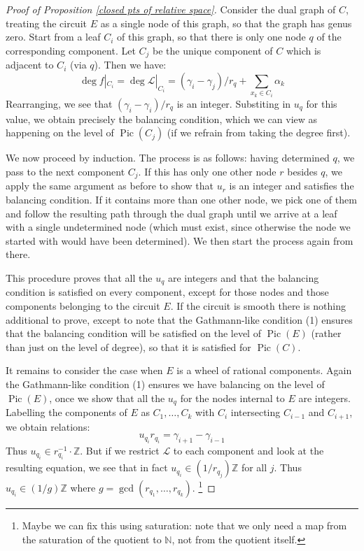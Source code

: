 \documentclass[11pt]{amsart}
\newcommand{\basenote}[1]{\footnote{\color{red}#1}}
\newcommand{\Z}{\mathbb{Z}}
\newcommand{\N}{\mathbb{N}}
\newcommand{\Pic}{\operatorname{Pic}}
\newcommand{\Lcal}{\mathcal{L}}
\theoremstyle{definition}
\theoremstyle{definition}
\begin{document}
\begin{proof}[Proof of Proposition \ref{closed pts of relative space}]
Consider the dual graph of $C$, treating the circuit $E$ as a single node of this graph, so that the graph has genus zero. Start from a leaf $C_i$ of this graph, so that there is only one node $q$ of the corresponding component. Let $C_j$ be the unique component of $C$ which is adjacent to $C_i$ (via $q$). Then we have:
\begin{equation*} \deg f|_{C_i} = \deg \Lcal|_{C_i} = (\gamma_i - \gamma_j)/r_q + \sum_{x_k \in C_i} \alpha_k \end{equation*}
Rearranging, we see that $(\gamma_i - \gamma_i)/r_q$ is an integer. Substiting in $u_q$ for this value, we obtain precisely the balancing condition, which we can view as happening on the level of $\Pic (C_j)$ (if we refrain from taking the degree first).

We now proceed by induction. The process is as follows: having determined $q$, we pass to the next component $C_j$. If this has only one other node $r$ besides $q$, we apply the same argument as before to show that $u_r$ is an integer and satisfies the balancing condition. If it contains more than one other node, we pick one of them and follow the resulting path through the dual graph until we arrive at a leaf with a single undetermined node (which must exist, since otherwise the node we started with would have been determined). We then start the process again from there.

This procedure proves that all the $u_q$ are integers and that the balancing condition is satisfied on every component, except for those nodes and those components belonging to the circuit $E$. If the circuit is smooth there is nothing additional to prove, except to note that the Gathmann-like condition (1) ensures that the balancing condition will be satisfied on the level of $\Pic(E)$ (rather than just on the level of degree), so that it is satisfied for $\Pic(C)$.

It remains to consider the case when $E$ is a wheel of rational components. Again the Gathmann-like condition (1) ensures we have balancing on the level of $\Pic(E)$, once we show that all the $u_q$ for the nodes internal to $E$ are integers. Labelling the components of $E$ as $C_1,\ldots,C_k$ with $C_i$ intersecting $C_{i-1}$ and $C_{i+1}$, we obtain relations:
\begin{equation*} u_{q_i} r_{q_i} = \gamma_{i+1} - \gamma_{i-1} \end{equation*}
Thus $u_{q_i} \in r_{q_i}^{-1} \cdot \Z$. But if we restrict $\Lcal$ to each component and look at the resulting equation, we see that in fact $u_{q_i} \in (1/r_{q_j}) \Z$ for all $j$. Thus $u_{q_i} \in (1/g) \Z$ where $g = \operatorname{gcd}(r_{q_1},\ldots,r_{q_k})$. \basenote{Maybe we can fix this using saturation: note that we only need a map from the saturation of the quotient to $\N$, not from the quotient itself.}


\end{proof}
\newpage
\end{document}
